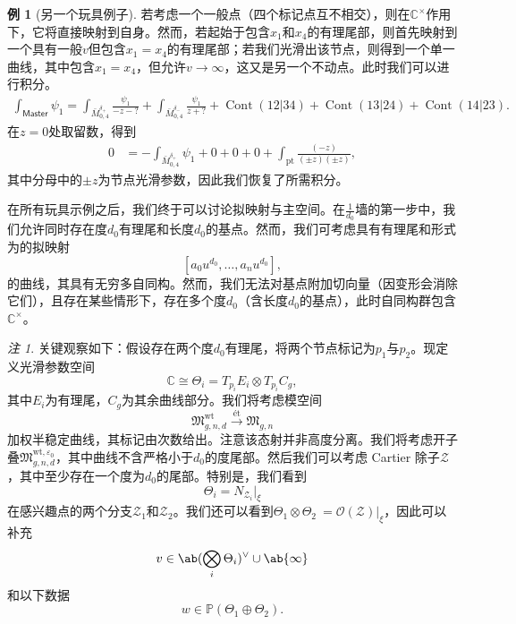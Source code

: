 \documentclass{amsart}
\theoremstyle{definition}
\newtheorem{exm}[thm]{例}
\theoremstyle{remark}
\newtheorem{rmk}[thm]{注}
\theoremstyle{plain}
\theoremstyle{definition}
\theoremstyle{remark}
\newcommand{\C}{\mathbb{C}}
\renewcommand{\P}{\mathbb{P}}
\newcommand{\ep}{\varepsilon}
\newcommand{\mc}[1]{\mathcal{#1}}
\newcommand{\mf}[1]{\mathfrak{#1}}
\newcommand{\mr}[1]{\mathrm{#1}}
\newcommand{\on}[1]{\operatorname{#1}}
\newcommand{\ms}[1]{\mathsf{#1}}
\newcommand{\1}{\mathbf{1}}
\newcommand{\2}{\mathbf{2}}
\newcommand{\3}{\mathbf{3}}
\begin{document}
\begin{exm}[另一个玩具例子]
    若考虑一个一般点（四个标记点互不相交），则在\(\C^{\times}\)作用下，它将直接映射到自身。然而，若起始于包含\(x_1\)和\(x_4\)的有理尾部，则首先映射到一个具有一般\(v\)但包含\(x_1 = x_4\)的有理尾部；若我们光滑出该节点，则得到一个单一曲线，其中包含\(x_1 = x_4\)，但允许\(v \to \infty\)，这又是另一个不动点。此时我们可以进行积分。
    \begin{align*}
        \int_{\ms{Master}} \psi_1 = \int_{\bar{M}_{0,4}^{\delta_+}} \frac{\psi_1}{-z-?} + \int_{\bar{M}_{0,4}^{\delta_-}} \frac{\psi_1}{z+?} + \on{Cont}(12|34) + \on{Cont}(13|24) + \on{Cont}(14|23).
    \end{align*}
在\(z = 0\)处取留数，得到
    \begin{align*}
        0 &= - \int_{\bar{M}_{0,4}^{\delta_+}} \psi_1 + 0 + 0 + 0 + \int_{\mr{pt}} \frac{(-z)}{(\pm z)(\pm z)},
    \end{align*}
其中分母中的\(\pm z\)为节点光滑参数，因此我们恢复了所需积分。
\end{exm}

在所有玩具示例之后，我们终于可以讨论拟映射与主空间。在\(\frac{1}{d_0}\)墙的第一步中，我们允许同时存在度\(d_0\)有理尾和长度\(d_0\)的基点。然而，我们可考虑具有有理尾和形式为的拟映射
\[ [a_0 u^{d_0}, \ldots, a_n u^{d_0}], \]
的曲线，其具有无穷多自同构。然而，我们无法对基点附加切向量（因变形会消除它们），且存在某些情形下，存在多个度\(d_0\)（含长度\(d_0\)的基点），此时自同构群包含\(\C^{\times}\)。

\begin{rmk}
关键观察如下：假设存在两个度\(d_0\)有理尾，将两个节点标记为\(p_1\)与\(p_2\)。现定义光滑参数空间
    \[ \C \cong \Theta_i = T_{p_i} E_i \otimes T_{p_i} C_g, \]
其中\(E_i\)为有理尾，\(C_g\)为其余曲线部分。我们将考虑模空间
    \[ \mf{M}_{g,n,d}^{\mr{wt}} \xrightarrow{\text{\'et}} \mf{M}_{g,n} \]
    加权半稳定曲线，其标记由次数给出。注意该态射并非高度分离。我们将考虑开子叠\(\mf{M}_{g,n,d}^{\mr{wt}, \ep_0}\)，其中曲线不含严格小于\(d_0\)的度尾部。然后我们可以考虑 Cartier 除子\(\mc{Z}\)，其中至少存在一个度为\(d_0\)的尾部。特别是，我们看到
    \[ \Theta_i = N_{\mc{Z}_i} |_{\xi} \]
    在感兴趣点的两个分支\(\mc{Z}_1\)和\(\mc{Z}_2\)。我们还可以看到\(\Theta_1 \otimes \Theta_2\ = \mc{O}(\mc{Z})|_{\xi}\)，因此可以补充
    \[ v \in \ab(\bigotimes_i \Theta_i)^{\vee} \cup \ab\{\infty\} \]
和以下数据
    \[ w \in \P(\Theta_1 \oplus\Theta_2). \]
\end{rmk}
\end{document}
